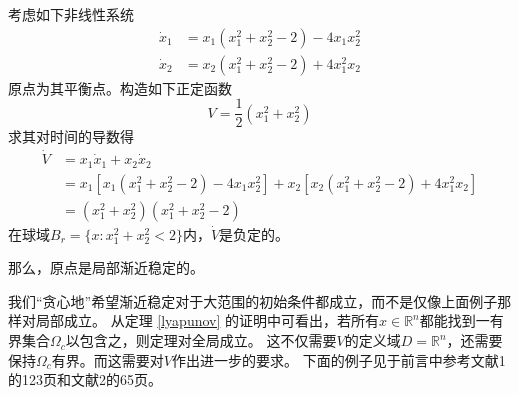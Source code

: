 \begin{example}[局部渐近稳定]
  考虑如下非线性系统\[\begin{aligned}\dot{x}_1&=x_1(x_1^2+x_2^2-2)-4x_1x_2^2\\\dot{x}_2&=x_2(x_1^2+x_2^2-2)+4x_1^2x_2\end{aligned}\]
  原点为其平衡点。构造如下正定函数\[V=\frac{1}{2}(x_1^2+x_2^2)\]
  求其对时间的导数得\[\begin{aligned}
    \dot{V}& =x_{1}\dot{x}_{1}+x_{2}\dot{x}_{2} \\
    &=x_{1}[x_{1}(x_{1}^{2}+x_{2}^{2}-2)-4x_{1}x_{2}^{2}]+x_{2}[x_{2}(x_{1}^{2}+x_{2}^{2}-2)+4x_{1}^{2}x_{2}] \\
    &=(x_1^2+x_2^2)(x_1^2+x_2^2-2)
    \end{aligned}\]
  在球域$B_r=\{x:x_1^2+x_2^2<2\}$内，$\dot{V}$是负定的。

  那么，原点是局部渐近稳定的。
\end{example}
我们“贪心地”希望渐近稳定对于大范围的初始条件都成立，而不是仅像上面例子那样对局部成立。
从定理 \ref{lyapunov} 的证明中可看出，若所有$x\in\mathbb{R}^n$都能找到一有界集合$\Omega_c$以包含之，则定理对全局成立。
这不仅需要$V$的定义域$D=\mathbb{R}^n$，还需要保持$\Omega_c$有界。而这需要对$V$作出进一步的要求。
下面的例子见于前言中参考文献1的123页和文献2的65页。


